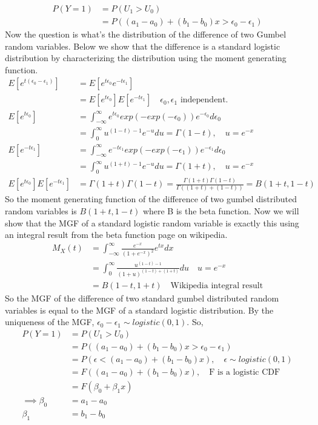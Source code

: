 \documentclass[12pt]{article}
\begin{document}
\begin{enumerate}
\begin{enumerate}[(a)]
	\begin{align*}
	P(Y=1) &= P(U_1 > U_0)\\
	&= P((a_1 - a_0) + (b_1 - b_0)x > \epsilon_0 - \epsilon_1) 
	\end{align*}
	Now the question is what's the distribution of the difference of two Gumbel random variables. Below we show that the difference is a standard logistic distribution by characterizing the distribution using the moment generating function. 
	\begin{align*}
		E[e^{t(\epsilon_0 - \epsilon_1)}] &= E[e^{t\epsilon_0}e^{-t\epsilon_1}] \\
		&= E[e^{t\epsilon_0}]E[e^{-t\epsilon_1}] \quad\text{$\epsilon_0, \epsilon_1$ independent.}\\
		E[e^{t\epsilon_0}] &= \int_{-\infty}^{\infty} e^{t\epsilon_0} exp(-exp(-\epsilon_0)) e^{-\epsilon_0} d\epsilon_0 \\ 
		&= \int_{0}^{\infty} u^{(1-t) -1}e^{-u} du = \Gamma(1-t), \quad \text{$u = e^{-x}$}\\
		E[e^{-t\epsilon_1}] &= \int_{-\infty}^{\infty} e^{-t\epsilon_1} exp(-exp(-\epsilon_1)) e^{-\epsilon_1} d\epsilon_0 \\ 
		&= \int_{0}^{\infty} u^{(1+t) -1}e^{-u} du = \Gamma(1+t),  \quad \text{$u = e^{-x}$}\\
		E[e^{t\epsilon_0}]E[e^{-t\epsilon_1}] &=\Gamma(1+t)\Gamma(1-t) = \frac{\Gamma(1+t)\Gamma(1-t)}{\Gamma((1+t) + (1-t))} = B(1+t, 1-t) 	
\end{align*}
So the moment generating function of the difference of two gumbel distributed random variables is $B(1+t, 1-t)$ where B is the beta function. Now we will show that the MGF of a standard logistic random variable is exactly this using an integral result from the beta function page on wikipedia. 
\begin{align*}
M_X(t) &= \int_{-\infty}^{\infty} \frac{e^{-x}}{(1 + e^{-x})^2}e^{tx} dx \\
&= \int_{0}^{\infty}\frac{u^{(1-t)-1}}{(1+u)^{(1-t)+(1+t)}} du \quad \text{$u = e^{-x}$} \\
&= B(1-t, 1+t) \quad \text{Wikipedia integral result}
\end{align*}
So the MGF of the difference of two standard gumbel distributed random variables is equal to the MGF of a standard logistic distribution. By the uniqueness of the MGF, $\epsilon_0 - \epsilon_1 \sim logistic(0,1)$. So, 
\begin{align*}
P(Y=1) &= P(U_1 > U_0)\\
&= P((a_1 - a_0) + (b_1 - b_0)x > \epsilon_0 - \epsilon_1)  \\
&= P(\epsilon< (a_1 - a_0) + (b_1 - b_0)x), \quad \epsilon \sim logistic(0,1) \\
&=F((a_1 - a_0) + (b_1 - b_0)x), \quad \text{F is a logistic CDF} \\
&= F(\beta_0 + \beta_1 x) \\
\implies \beta_0 &= a_1 - a_0 \\
\beta_1 &= b_1 - b_0
\end{align*}


\end{enumerate}
\end{enumerate}
\end{document}
